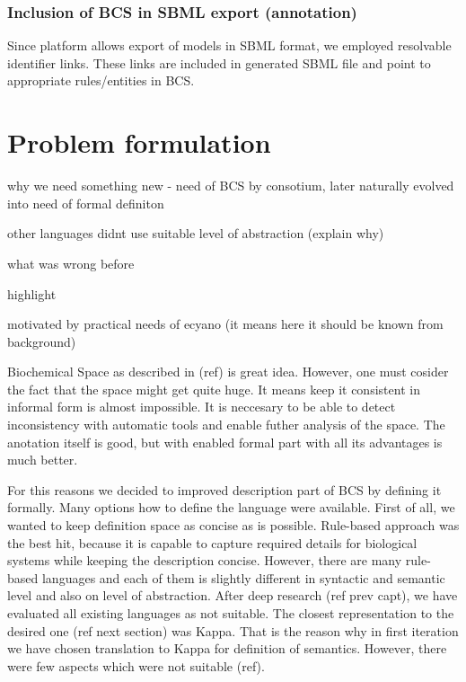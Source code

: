 \documentclass[12pt]{fithesis2}
\begin{document}
\subsection{Inclusion of BCS in SBML export (annotation)}

Since platform allows export of models in SBML format, we employed resolvable identifier links. These links are included in generated SBML file and point to appropriate rules/entities in BCS. 

\chapter{Problem formulation}

why we need something new - need of BCS by consotium, later naturally evolved into need of formal definiton

other languages didnt use suitable level of abstraction (explain why)

what was wrong before

highlight 

motivated by practical needs of ecyano (it means here it should be known from background)

Biochemical Space as described in (ref) is great idea. However, one must cosider the fact that the space might get quite huge. It means keep it consistent in informal form is almost impossible. It is neccesary to be able to detect inconsistency with automatic tools and enable futher analysis of the space. The anotation itself is good, but with enabled formal part with all its advantages is much better. 

For this reasons we decided to improved description part of BCS by defining it formally. Many options how to define the language were available. First of all, we wanted to keep definition space as concise as is possible. Rule-based approach was the best hit, because it is capable to capture required details for biological systems while keeping the description concise. However, there are many rule-based languages and each of them is slightly different in syntactic and semantic level and also on level of abstraction. After deep research (ref prev capt), we have evaluated all existing languages as not suitable. The closest representation to the desired one (ref next section) was Kappa. That is the reason why in first iteration we have chosen translation to Kappa for definition of semantics. However, there were few aspects which were not suitable (ref).
\end{document}
